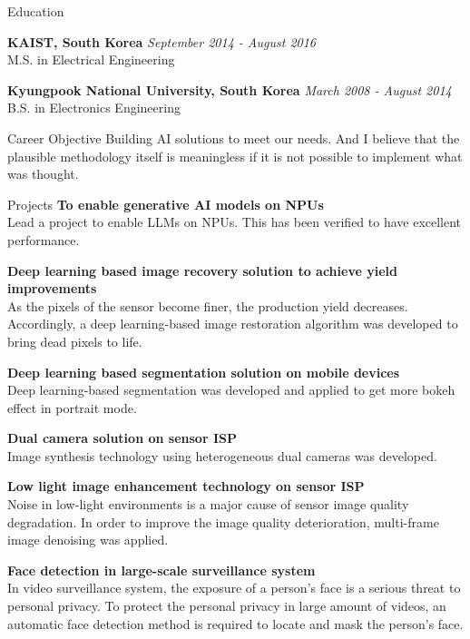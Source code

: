 \documentclass{resume}
\begin{document}
\begin{rSection}{Education}

{\bf KAIST, South Korea} \hfill {\em September 2014 - August 2016} 
\\ M.S. in Electrical Engineering\hfill

{\bf Kyungpook National University, South Korea} \hfill {\em March 2008 - August 2014} 
\\ B.S. in Electronics Engineering\hfill 

\end{rSection}

\begin{rSection}{Career Objective}
 Building AI solutions to meet our needs.
 And I believe that the plausible methodology itself is meaningless if it is not possible to implement what was thought.
\end{rSection}

\begin{rSection}{Projects}
{\bf To enable generative AI models on NPUs}
\\ Lead a project to enable LLMs on NPUs. This has been verified to have excellent performance.

{\bf Deep learning based image recovery solution to achieve yield improvements}
\\ As the pixels of the sensor become finer, the production yield decreases. Accordingly, a deep learning-based image restoration algorithm was developed to bring dead pixels to life.

{\bf Deep learning based segmentation solution on mobile devices}
\\ Deep learning-based segmentation was developed and applied to get more bokeh effect in portrait mode.

{\bf Dual camera solution on sensor ISP}
\\ Image synthesis technology using heterogeneous dual cameras was developed.

{\bf Low light image enhancement technology on sensor ISP}
\\ Noise in low-light environments is a major cause of sensor image quality degradation. In order to improve the image quality deterioration, multi-frame image denoising was applied.

{\bf Face detection in large-scale surveillance system }
\\ In video surveillance system, the exposure of a person’s face is a serious threat to personal privacy.
To protect the personal privacy in large amount of videos, an automatic face detection method is required to locate and mask the person’s face.

\end{rSection}
\end{document}
